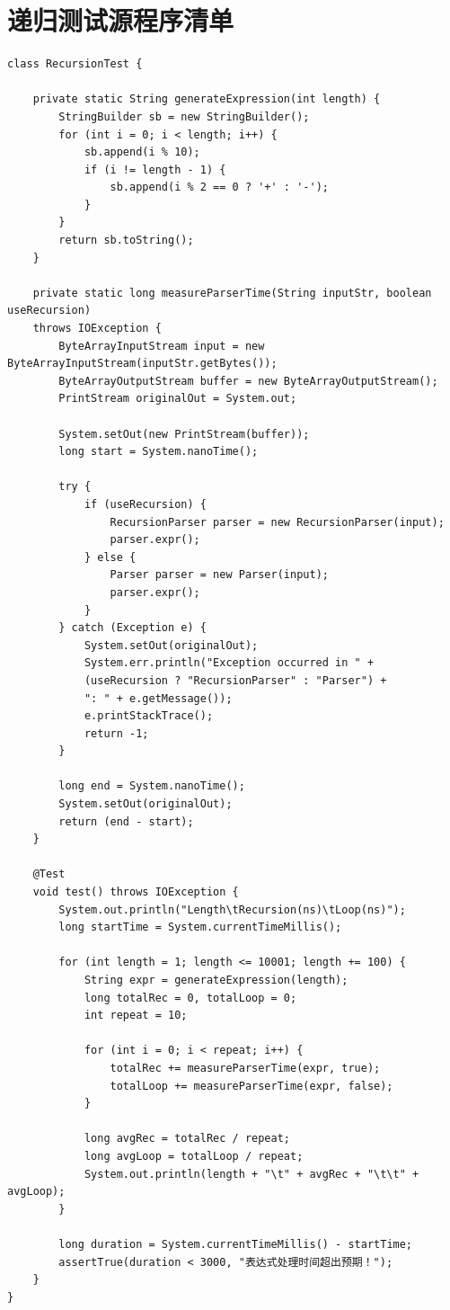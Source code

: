\documentclass[a4paper, twoside, utf8]{ctexart}
\begin{document}
    \section{递归测试源程序清单}

    \begin{verbatim}
class RecursionTest {

    private static String generateExpression(int length) {
        StringBuilder sb = new StringBuilder();
        for (int i = 0; i < length; i++) {
            sb.append(i % 10);
            if (i != length - 1) {
                sb.append(i % 2 == 0 ? '+' : '-');
            }
        }
        return sb.toString();
    }

    private static long measureParserTime(String inputStr, boolean useRecursion)
    throws IOException {
        ByteArrayInputStream input = new ByteArrayInputStream(inputStr.getBytes());
        ByteArrayOutputStream buffer = new ByteArrayOutputStream();
        PrintStream originalOut = System.out;

        System.setOut(new PrintStream(buffer));
        long start = System.nanoTime();
        
        try {
            if (useRecursion) {
                RecursionParser parser = new RecursionParser(input);
                parser.expr();
            } else {
                Parser parser = new Parser(input);
                parser.expr();
            }
        } catch (Exception e) {
            System.setOut(originalOut);
            System.err.println("Exception occurred in " +
            (useRecursion ? "RecursionParser" : "Parser") +
            ": " + e.getMessage());
            e.printStackTrace();
            return -1;
        }

        long end = System.nanoTime();
        System.setOut(originalOut);
        return (end - start);
    }

    @Test
    void test() throws IOException {
        System.out.println("Length\tRecursion(ns)\tLoop(ns)");
        long startTime = System.currentTimeMillis();
        
        for (int length = 1; length <= 10001; length += 100) {
            String expr = generateExpression(length);
            long totalRec = 0, totalLoop = 0;
            int repeat = 10;

            for (int i = 0; i < repeat; i++) {
                totalRec += measureParserTime(expr, true);
                totalLoop += measureParserTime(expr, false);
            }

            long avgRec = totalRec / repeat;
            long avgLoop = totalLoop / repeat;
            System.out.println(length + "\t" + avgRec + "\t\t" + avgLoop);
        }
        
        long duration = System.currentTimeMillis() - startTime;
        assertTrue(duration < 3000, "表达式处理时间超出预期！");
    }
}
    \end{verbatim}
\end{document}
